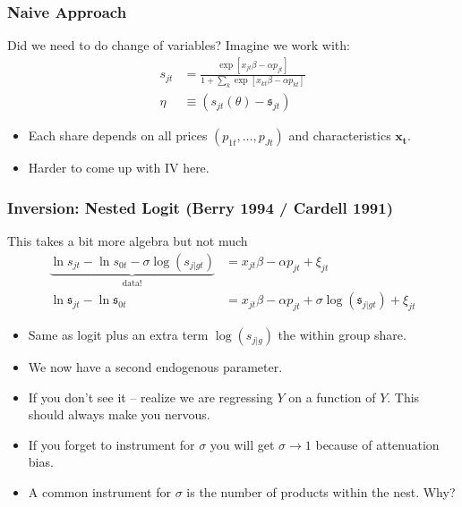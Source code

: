 \documentclass[xcolor=pdftex,dvipsnames,table,mathserif,aspectratio=169]{beamer}
\begin{document}
\begin{frame}
\frametitle{Naive Approach}
Did we need to do change of variables? Imagine we work with:
\begin{align*}
s_{jt} &= \frac{\exp[x_{jt} \beta -\alpha p_{jt} ]}{1+\sum_k \exp[x_{kt} \beta -\alpha p_{kt}  ]}\\
\eta &\equiv (s_{jt}(\theta) - \mathfrak{s}_{jt}) 
\end{align*}
\begin{itemize}
\item Each share depends on all prices $(p_{1t},\ldots,p_{Jt})$ and characteristics $\mathbf{x_t}$.
\item Harder to come up with IV here.
 \end{itemize}
\end{frame}


\begin{frame}
\frametitle{Inversion: Nested Logit (Berry 1994 / Cardell 1991)}
This takes a bit more algebra but not much
\begin{align*}
\underbrace{\ln s_{jt}- \ln s_{0t}  - \sigma \log(s_{j|gt}) }_{\text{data!}}&= x_{jt} \beta -\alpha p_{jt} +  \xi_{jt} \\
\ln \mathfrak{s}_{jt}- \ln \mathfrak{s}_{0t} &= x_{jt} \beta -\alpha p_{jt} +  \sigma \log(\mathfrak{s}_{j|gt})  +  \xi_{jt}
\end{align*}
 \begin{itemize}
\item Same as logit plus an extra term $\log(s_{j|g})$ the \alert{within group share}.
\item We now have a second endogenous parameter.
\item If you don't see it -- realize we are regressing $Y$ on a function of $Y$. This should always make you nervous.
\item If you forget to instrument for $\sigma$ you will get $\sigma \rightarrow 1$ because of \alert{attenuation bias}.
\item A common instrument for $\sigma$ is the number of products within the nest. Why?
 \end{itemize}
\end{frame}
\end{document}
